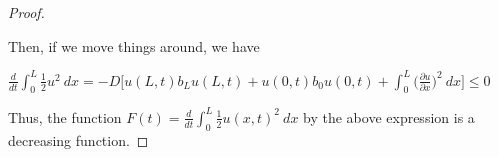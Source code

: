 \documentclass[12pt, executivepaper]{article}
\begin{document}
\begin{flushleft}
\begin{proof}
\begin{center}
\end{center}

Then, if we move things around, we have

\begin{center}

$\frac{d}{dt}\int_{0}^{L} \frac{1}{2} u^2 \ dx=-D\bigg[u(L,t) b_{L} u(L,t) + u(0,t) b_{0}u(0,t) + \int_{0}^{L} \bigg(\frac{\partial u}{\partial x}\bigg)^2 \ dx\bigg] \leq 0$

\end{center}

\pagebreak

\vspace*{-40mm}

Thus, the function $F(t)=\frac{d}{dt} \int_{0}^{L} \frac{1}{2} u(x,t)^2 \ dx$ by the above expression is a decreasing function.

\end{proof}

\end{flushleft}
\end{document}
